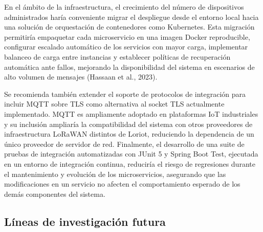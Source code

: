 \documentclass[12pt,a4paper,oneside]{report}
\begin{document}
En el ámbito de la infraestructura, el crecimiento del número de dispositivos administrados haría conveniente migrar el despliegue desde el entorno local hacia una solución de orquestación de contenedores como Kubernetes. Esta migración permitiría empaquetar cada microservicio en una imagen Docker reproducible, configurar escalado automático de los servicios con mayor carga, implementar balanceo de carga entre instancias y establecer políticas de recuperación automática ante fallos, mejorando la disponibilidad del sistema en escenarios de alto volumen de mensajes (Hassaan et al., 2023).

Se recomienda también extender el soporte de protocolos de integración para incluir MQTT sobre TLS como alternativa al socket TLS actualmente implementado. MQTT es ampliamente adoptado en plataformas IoT industriales y su inclusión ampliaría la compatibilidad del sistema con otros proveedores de infraestructura LoRaWAN distintos de Loriot, reduciendo la dependencia de un único proveedor de servidor de red. Finalmente, el desarrollo de una suite de pruebas de integración automatizadas con JUnit 5 y Spring Boot Test, ejecutada en un entorno de integración continua, reduciría el riesgo de regresiones durante el mantenimiento y evolución de los microservicios, asegurando que las modificaciones en un servicio no afecten el comportamiento esperado de los demás componentes del sistema.

\subsection*{Líneas de investigación futura}
\end{document}
